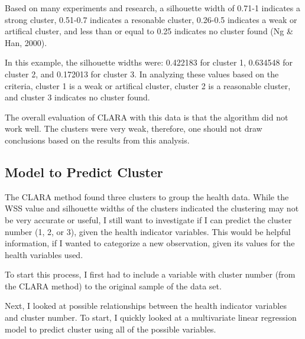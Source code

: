 \documentclass[12pt,twoside]{amherstthesis}
\begin{document}
  Based on many experiments and research, a silhouette width of 0.71-1
  indicates a strong cluster, 0.51-0.7 indicates a resonable cluster,
  0.26-0.5 indicates a weak or artifical cluster, and less than or equal
  to 0.25 indicates no cluster found (Ng \& Han, 2000).
  
  In this example, the silhouette widths were: 0.422183 for cluster 1,
  0.634548 for cluster 2, and 0.172013 for cluster 3. In analyzing these
  values based on the criteria, cluster 1 is a weak or artifical cluster,
  cluster 2 is a reasonable cluster, and cluster 3 indicates no cluster
  found.
  
  The overall evaluation of CLARA with this data is that the algorithm did
  not work well. The clusters were very weak, therefore, one should not
  draw conclusions based on the results from this analysis.
  
  \subsection{Model to Predict Cluster}\label{model-to-predict-cluster}
  
  The CLARA method found three clusters to group the health data. While
  the WSS value and silhouette widths of the clusters indicated the
  clustering may not be very accurate or useful, I still want to
  investigate if I can predict the cluster number (1, 2, or 3), given the
  health indicator variables. This would be helpful information, if I
  wanted to categorize a new observation, given its values for the health
  variables used.
  
  To start this process, I first had to include a variable with cluster
  number (from the CLARA method) to the original sample of the data set.
  
  \begin{Shaded}
  \begin{Highlighting}[]
  \StringTok{ }\OperatorTok{$}
  \StringTok{ }
  \end{Highlighting}
  \end{Shaded}
  
  Next, I looked at possible relationships between the health indicator
  variables and cluster number. To start, I quickly looked at a
  multivariate linear regression model to predict cluster using all of the
  possible variables.
  
\end{document}
